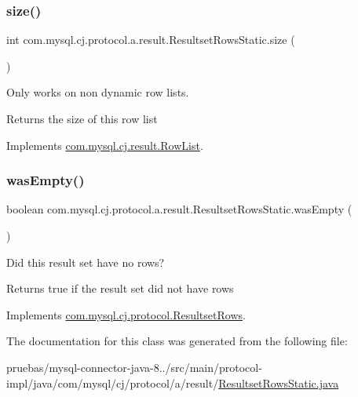 \subsubsection{\texorpdfstring{size()}{size()}}
{\footnotesize\ttfamily int com.\+mysql.\+cj.\+protocol.\+a.\+result.\+Resultset\+Rows\+Static.\+size (\begin{DoxyParamCaption}{ }\end{DoxyParamCaption})}

Only works on non dynamic row lists.

\begin{DoxyReturn}{Returns}
the size of this row list 
\end{DoxyReturn}


Implements \mbox{\hyperlink{interfacecom_1_1mysql_1_1cj_1_1result_1_1_row_list_a2b6e2d9ed59e362e06b9fc8a110ccd89}{com.\+mysql.\+cj.\+result.\+Row\+List}}.

\mbox{\label{classcom_1_1mysql_1_1cj_1_1protocol_1_1a_1_1result_1_1_resultset_rows_static_ad18792e2f43667c3dc0b6e41a6de3026}} 
\subsubsection{\texorpdfstring{was\+Empty()}{wasEmpty()}}
{\footnotesize\ttfamily boolean com.\+mysql.\+cj.\+protocol.\+a.\+result.\+Resultset\+Rows\+Static.\+was\+Empty (\begin{DoxyParamCaption}{ }\end{DoxyParamCaption})}

Did this result set have no rows?

\begin{DoxyReturn}{Returns}
true if the result set did not have rows 
\end{DoxyReturn}


Implements \mbox{\hyperlink{interfacecom_1_1mysql_1_1cj_1_1protocol_1_1_resultset_rows_a46258b5b85f7536a54d62054403e6cf8}{com.\+mysql.\+cj.\+protocol.\+Resultset\+Rows}}.



The documentation for this class was generated from the following file\+:\begin{DoxyCompactItemize}
\item 
pruebas/mysql-\/connector-\/java-\/8../src/main/protocol-\/impl/java/com/mysql/cj/protocol/a/result/\mbox{\hyperlink{_resultset_rows_static_8java}{Resultset\+Rows\+Static.\+java}}\end{DoxyCompactItemize}
